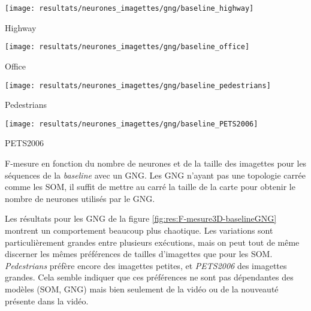 	\begin{figureth}
		\begin{subfigureth}{.45\textwidth}
			\texttt{[image: resultats/neurones\_imagettes/gng/baseline\_highway]}\caption{Highway}
		\end{subfigureth}
		\begin{subfigureth}{.45\textwidth}
			\texttt{[image: resultats/neurones\_imagettes/gng/baseline\_office]}\caption{Office}
		\end{subfigureth}
		\begin{subfigureth}{.45\textwidth}
			\texttt{[image: resultats/neurones\_imagettes/gng/baseline\_pedestrians]}\caption{Pedestrians}
		\end{subfigureth}
		\begin{subfigureth}{.45\textwidth}
			\texttt{[image: resultats/neurones\_imagettes/gng/baseline\_PETS2006]}\caption{PETS2006}
		\end{subfigureth}
		\caption[Nombre de neurones et de taille des imagettes, GNG/baseline]{F-mesure en fonction du nombre de neurones et de la taille des imagettes pour les séquences de la \textit{baseline} avec un GNG. Les GNG n'ayant pas une topologie carrée comme les SOM, il suffit de mettre au carré la taille de la carte pour obtenir le nombre de neurones utilisés par le GNG.}\label{fig:res:F-mesure3D-baselineGNG}
	\end{figureth}

	Les résultats pour les GNG de la figure \ref{fig:res:F-mesure3D-baselineGNG} montrent un comportement beaucoup plus chaotique. Les variations sont particulièrement grandes entre plusieurs exécutions, mais on peut tout de même discerner les mêmes préférences de tailles d'imagettes que pour les SOM. \textit{Pedestrians} préfère encore des imagettes petites, et \textit{PETS2006} des imagettes grandes. Cela semble indiquer que ces préférences ne sont pas dépendantes des modèles (SOM, GNG) mais bien seulement de la vidéo ou de la nouveauté présente dans la vidéo.

